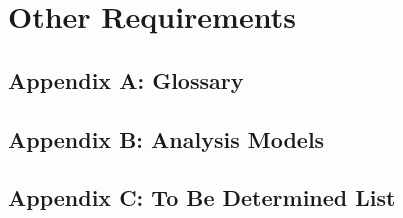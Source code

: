 \documentclass{scrreprt}
\begin{document}
\chapter{Other Requirements}

\section{Appendix A: Glossary}

\section{Appendix B: Analysis Models}

\section{Appendix C: To Be Determined List}
\end{document}
